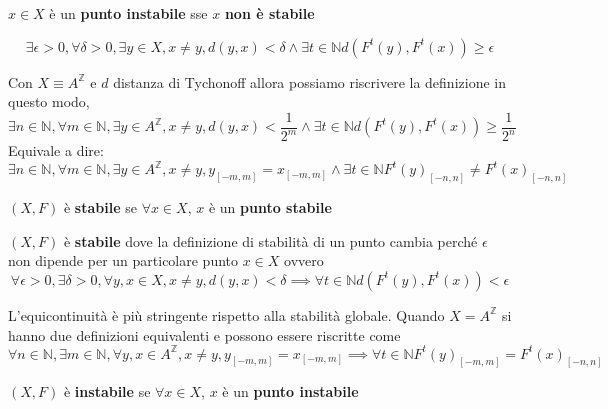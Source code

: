 \begin{definizione} 
    $x\in X$ è un \textbf{punto instabile} sse $x$ \textbf{non è stabile}

    $$\exists \epsilon > 0,\forall \delta > 0, \exists y\in X,x \ne y, d(y,x) < \delta \land \exists t\in \mathbb{N} d(F^t(y),F^t(x))\ge \epsilon$$
    
    Con $X \equiv A^\mathbb{Z}$ e $d$ distanza di Tychonoff allora possiamo riscrivere 
    la definizione in questo modo,
    $$\exists n\in \mathbb{N} ,\forall m\in \mathbb{N} , \exists y\in A^\mathbb{Z},x \ne y, d(y,x) < \frac{1}{2^m} \land \exists t\in \mathbb{N} d(F^t(y),F^t(x))\ge \frac{1}{2^n}$$
    Equivale a dire:
    $$\exists n\in \mathbb{N} ,\forall m\in \mathbb{N} , \exists y\in A^\mathbb{Z},x \ne y, y_{[-m,m]} = x_{[-m,m]} \land \exists t\in \mathbb{N} F^t(y)_{[-n,n]}\ne F^t(x)_{[-n,n]}$$
    
\end{definizione}

\begin{definizione} 
    $(X,F)$ è \textbf{stabile} se $\forall x \in X$, $x$ è un \textbf{punto stabile}
\end{definizione}

\begin{definizione} 
    $(X,F)$ è \textbf{stabile} dove la definizione di stabilità di un punto cambia
    perché $\epsilon$ non dipende per un particolare punto $x\in X$ ovvero
    $$\forall \epsilon > 0,\exists \delta > 0, \forall y, x\in X,x \ne y, d(y,x) < \delta \implies \forall t\in \mathbb{N} d(F^t(y),F^t(x))< \epsilon$$
\end{definizione}

\begin{nota}
    L'equicontinuità è più stringente rispetto alla stabilità globale. Quando $X=A^\mathbb{Z}$
    si hanno due definizioni equivalenti e possono essere riscritte come
    $$\forall n\in \mathbb{N} ,\exists m\in \mathbb{N} , \forall y,x\in A^\mathbb{Z},x \ne y, y_{[-m,m]} = x_{[-m,m]} \implies \forall t\in \mathbb{N} F^t(y)_{[-m,m]}=F^t(x)_{[-n,n]}$$
\end{nota}
\begin{definizione} 
    $(X,F)$ è \textbf{instabile} se $\forall x \in X$, $x$ è un \textbf{punto instabile}
\end{definizione}

